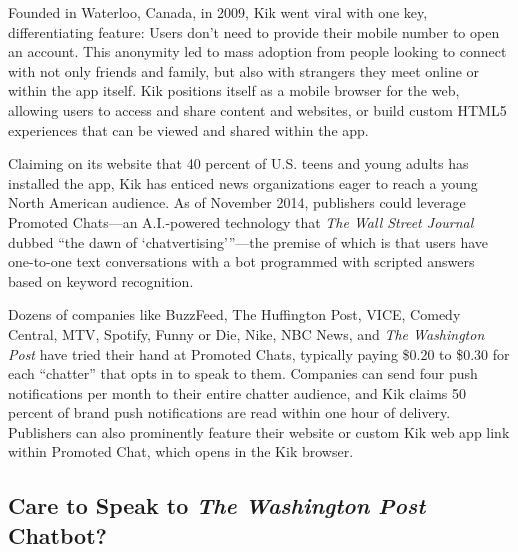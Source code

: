 \documentclass[notoc, symmetric, nobib, nols]{towcenter-guideto-book}
\begin{document}
Founded in Waterloo, Canada, in 2009, Kik went viral with one key, differentiating feature: Users don't need to provide their mobile number to open an account. This anonymity led to mass adoption from people looking to connect with not only friends and family, but also with strangers they meet online or within the app itself. Kik positions itself as a mobile browser for the web, allowing users to access and share content and websites, or build custom HTML5 experiences that can be viewed and shared within the app.

Claiming on its website that 40 percent of U.S. teens and young adults has installed the app, Kik has enticed news organizations eager to reach a young North American audience.\autocite{ForbesKik} As of November 2014, publishers could leverage Promoted Chats---an A.I.-powered technology that \textit{The Wall Street Journal} dubbed ``the dawn of `chatvertising'\thinspace''\autocite{WSJKik}---the premise of which is that users have one-to-one text conversations with a bot programmed with scripted answers based on keyword recognition. 

Dozens of companies like BuzzFeed, The Huffington Post, VICE, Comedy Central, MTV, Spotify, Funny or Die, Nike, NBC News, and \textit{The Washington Post} have tried their hand at Promoted Chats, typically paying \$0.20 to \$0.30 for each ``chatter'' that opts in to speak to them. Companies can send four push notifications per month to their entire chatter audience, and Kik claims 50 percent of brand push notifications are read within one hour of delivery. Publishers can also prominently feature their website or custom Kik web app link within Promoted Chat, which opens in the Kik browser.

\subsection[Care to Speak to the Washington Post Chatbot?]{Care to Speak to \textit{The Washington Post} Chatbot?}
\end{document}
